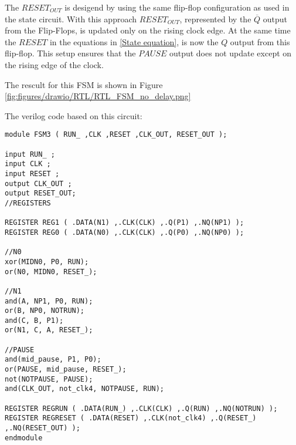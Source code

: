 The $RESET_{OUT}$ is desigend by using the same flip-flop configuration as used in the state circuit. With this approach $RESET_{OUT}$, represented by the $\overline{Q}$ output from the Flip-Flops, is updated only on the rising clock edge. At the same time the $RESET$ in the equations in \ref{State equation}, is now the $Q$ output from this flip-flop. This setup ensures that the $PAUSE$ output does not update except on the rising edge of the clock.

The rescult for this FSM is shown in Figure \ref{fig:figures/drawio/RTL/RTL_FSM_no_delay.png}

The verilog code based on this circuit:
\begin{lstlisting}
module FSM3 ( RUN_ ,CLK ,RESET ,CLK_OUT, RESET_OUT );

input RUN_ ;
input CLK ;
input RESET ;
output CLK_OUT ;
output RESET_OUT;
//REGISTERS

REGISTER REG1 ( .DATA(N1) ,.CLK(CLK) ,.Q(P1) ,.NQ(NP1) );
REGISTER REG0 ( .DATA(N0) ,.CLK(CLK) ,.Q(P0) ,.NQ(NP0) ); 

//N0
xor(MIDN0, P0, RUN);
or(N0, MIDN0, RESET_); 

//N1
and(A, NP1, P0, RUN);
or(B, NP0, NOTRUN);
and(C, B, P1);
or(N1, C, A, RESET_);

//PAUSE
and(mid_pause, P1, P0);
or(PAUSE, mid_pause, RESET_);
not(NOTPAUSE, PAUSE);
and(CLK_OUT, not_clk4, NOTPAUSE, RUN);

REGISTER REGRUN ( .DATA(RUN_) ,.CLK(CLK) ,.Q(RUN) ,.NQ(NOTRUN) ); 
REGISTER REGRESET ( .DATA(RESET) ,.CLK(not_clk4) ,.Q(RESET_) ,.NQ(RESET_OUT) ); 
endmodule
\end{lstlisting}




    


        
    
    

